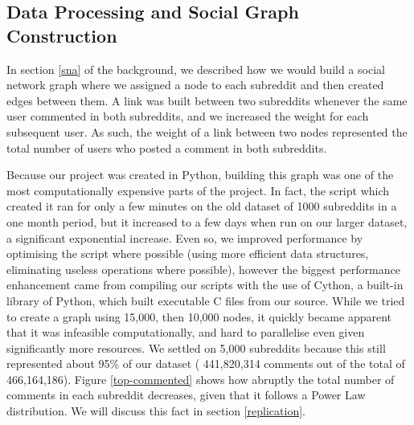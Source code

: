 \documentclass[bsc,frontabs,twoside,singlespacing,parskip,deptreport]{infthesis}
\begin{document}
\begin{table}[!h]
\centering
{}
\caption{Statistics generated from the data}
\label{tab:statistics}
\end{table}

\subsection{Data Processing and Social Graph Construction}\label{processing}
In section \ref{sna} of the background, we described how we would build a social network graph where we assigned a node to each subreddit and then created edges between them. A link was built between two subreddits whenever the same user commented in both subreddits, and we increased the weight for each subsequent user. As such, the weight of a link between two nodes represented the total number of users who posted a comment in both subreddits.

Because our project was created in Python, building this graph was one of the most computationally expensive parts of the project. In fact, the script which created it ran for only a few minutes on the old dataset of 1000 subreddits in a one month period, but it increased to a few days when run on our larger dataset, a significant exponential increase. Even so, we improved performance by optimising the script where possible (using more efficient data structures, eliminating useless operations where possible), however the biggest performance enhancement came from compiling our scripts with the use of Cython, a built-in library of Python, which built executable C files from our source. While we tried to create a graph using 15,000, then 10,000 nodes, it quickly became apparent that it was infeasible computationally, and hard to parallelise even given significantly more resources. We settled on 5,000 subreddits because this still represented about 95\% of our dataset ( 	441,820,314 comments out of the total of 466,164,186). Figure \ref{top-commented} shows how abruptly the total number of comments in each subreddit decreases, given that it follows a Power Law distribution. We will discuss this fact in section \ref{replication}.
\end{document}
